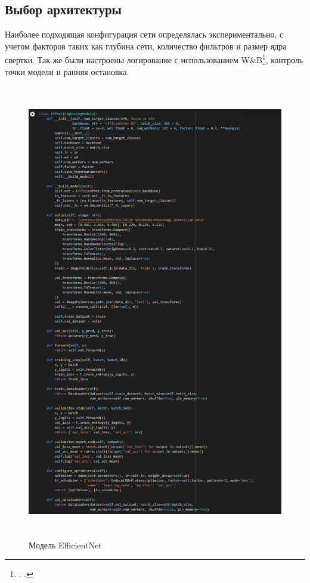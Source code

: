 \documentclass[14pt]{extarticle}
\begin{document}
\subsection{Выбор архитектуры}
\hspace{1cm}Наиболее подходящая конфигурация сети определялась экспериментально, с учетом факторов таких как глубина сети, количество фильтров и размер ядра свертки. Так же были настроены логирование с использованием W\&B\footnote{\citeauthor{wandb}. \emph{}.}, контроль точки модели и ранняя остановка.
\begin{figure}[H]
\centering
\begin{minipage}{0.49\textwidth}
  \centering
  \includegraphics[height=20cm]{images/6.png}  
  \caption{Модель EfficientNet}
  \label{fig:12}
\end{minipage}

\end{figure}
\end{document}
